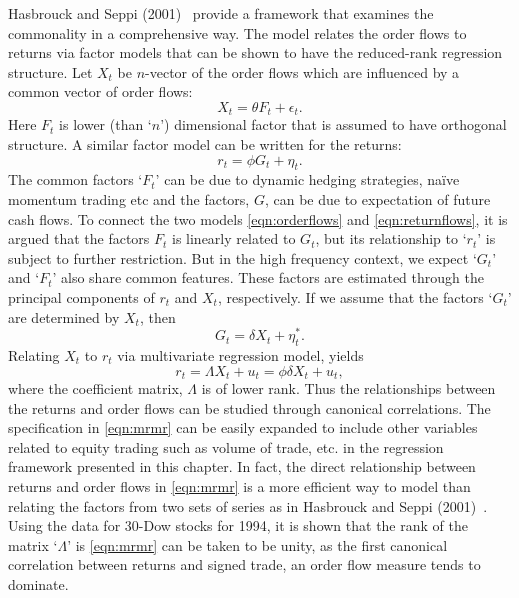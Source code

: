 Hasbrouck and Seppi (2001)~\cite{seppi2001} provide a framework that examines the commonality in a comprehensive way. The model relates the order flows to returns via factor models that can be shown to have the reduced-rank regression structure. Let $X_t$ be $n$-vector of the order flows which are influenced by a common vector of order flows:
	\begin{equation} \label{eqn:orderflows}
	X_t= \theta F_t + \epsilon_t.
	\end{equation}
Here $F_t$ is lower (than `$n$') dimensional factor that is assumed to have orthogonal structure. A similar factor model can be written for the returns:
	\begin{equation} \label{eqn:returnflows}
	r_t= \phi G_t + \eta_t.
	\end{equation}
The common factors `$F_t$' can be due to dynamic hedging strategies, na\"{i}ve momentum trading etc and the factors, $G$, can be due to expectation of future cash flows. To connect the two models \eqref{eqn:orderflows} and \eqref{eqn:returnflows}, it is argued that the factors $F_t$ is linearly related to $G_t$, but its relationship to `$r_t$' is subject to further restriction. But in the high frequency context, we expect `$G_t$' and `$F_t$' also share common features. These factors are estimated through the principal components of $r_t$ and $X_t$, respectively. If we assume that the factors `$G_t$' are determined by $X_t$, then
	\begin{equation} \label{eqn:determinedfactors}
	G_t= \delta X_t + \eta_t^*.
	\end{equation}
Relating $X_t$ to $r_t$ via multivariate regression model, yields 
	\begin{equation} \label{eqn:mrmr}
	r_t= \Lambda X_t + u_t = \phi \delta X_t + u_t,
	\end{equation}
where the coefficient matrix, $\Lambda$ is of lower rank. Thus the relationships between the returns and order flows can be studied through canonical correlations. The specification in \eqref{eqn:mrmr} can be easily expanded to include other variables related to equity trading such as volume of trade, etc. in the regression framework presented in this chapter. In fact, the direct relationship between returns and order flows in \eqref{eqn:mrmr} is a more efficient way to model than relating the factors from two sets of series as in Hasbrouck and Seppi (2001)~\cite{seppi2001}. Using the data for 30-Dow stocks for 1994, it is shown that the rank of the matrix `$\Lambda$' is \eqref{eqn:mrmr} can be taken to be unity, as the first canonical correlation between returns and signed trade, an order flow measure tends to dominate.



